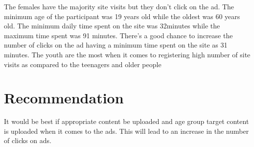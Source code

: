 \documentclass[
]{article}
\begin{document}
The females have the majority site visits but they don't click on the
ad. The minimum age of the participant was 19 years old while the oldest
was 60 years old. The minimum daily time spent on the site was 32minutes
while the maximum time spent was 91 minutes. There's a good chance to
increase the number of clicks on the ad having a minimum time spent on
the site as 31 minutes. The youth are the most when it comes to
registering high number of site visits as compared to the teenagers and
older people

\hypertarget{recommendation}{%
\section{Recommendation}\label{recommendation}}

It would be best if appropriate content be uploaded and age group target
content is uploaded when it comes to the ads. This will lead to an
increase in the number of clicks on ads.
\end{document}
